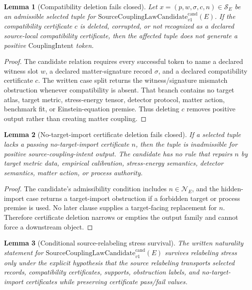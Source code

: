 \documentclass[11pt]{article}
\newcommand{\SourceCoupCand}{\mathrm{SourceCouplingLawCandidate}^{\mathrm{cand}}_{v1}}
\newcommand{\CouplingIntent}{\mathrm{CouplingIntent}}
\newtheorem{lemma}{Lemma}
\begin{document}
\begin{lemma}[Compatibility deletion fails closed]
Let \(x=(p,w,\sigma,c,n)\in\mathcal{S}_E\) be an admissible selected tuple for
\(\SourceCoupCand(E)\). If the compatibility certificate \(c\) is deleted,
corrupted, or not recognized as a declared source-local compatibility
certificate, then the affected tuple does not generate a positive
\(\CouplingIntent\) token.
\end{lemma}

\begin{proof}
The candidate relation requires every successful token to name a declared
witness slot \(w\), a declared matter-signature record \(\sigma\), and a
declared compatibility certificate \(c\). The written case split returns the
witness/signature mismatch obstruction whenever compatibility is absent. That
branch contains no target atlas, target metric, stress-energy tensor,
detector protocol, matter action, benchmark fit, or Einstein-equation premise.
Thus deleting \(c\) removes positive output rather than creating matter
coupling.
\end{proof}

\begin{lemma}[No-target-import certificate deletion fails closed]
If a selected tuple lacks a passing no-target-import certificate \(n\), then
the tuple is inadmissible for positive source-coupling-intent output. The
candidate has no rule that repairs \(n\) by target metric data, empirical
calibration, stress-energy semantics, detector semantics, matter action, or
process authority.
\end{lemma}

\begin{proof}
The candidate's admissibility condition includes \(n\in\mathcal{N}_E\), and
the hidden-import case returns a target-import obstruction if a forbidden
target or process premise is used. No later clause supplies a target-facing
replacement for \(n\). Therefore certificate deletion narrows or empties the
output family and cannot force a downstream object.
\end{proof}

\begin{lemma}[Conditional source-relabeling stress survival]
The written naturality statement for \(\SourceCoupCand(E)\) survives
relabeling stress only under the explicit hypothesis that the source
relabeling transports selected records, compatibility certificates, supports,
obstruction labels, and no-target-import certificates while preserving
certificate pass/fail values.
\end{lemma}
\end{document}
